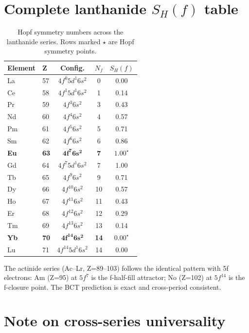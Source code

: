 \documentclass[aps,prl,onecolumn,superscriptaddress]{revtex4-2}
\begin{document}
\section{Complete lanthanide $S_H(f)$ table}

\begin{table}[h]
\centering
\caption{Hopf symmetry numbers across the lanthanide series.
Rows marked $\star$ are Hopf symmetry points.}
\begin{tabular}{llccc}
\toprule
Element & Z & Config. & $N_f$ & $S_H(f)$ \\
\midrule
La & 57 & $4f^0 5d^1 6s^2$ & 0 & 0.00 \\
Ce & 58 & $4f^1 5d^1 6s^2$ & 1 & 0.14 \\
Pr & 59 & $4f^3 6s^2$       & 3 & 0.43 \\
Nd & 60 & $4f^4 6s^2$       & 4 & 0.57 \\
Pm & 61 & $4f^5 6s^2$       & 5 & 0.71 \\
Sm & 62 & $4f^6 6s^2$       & 6 & 0.86 \\
\textbf{Eu} & \textbf{63} & $\mathbf{4f^7 6s^2}$
  & \textbf{7} & $\mathbf{1.00}^\star$ \\
Gd & 64 & $4f^7 5d^1 6s^2$ & 7 & 1.00 \\
Tb & 65 & $4f^9 6s^2$       & 9 & 0.71 \\
Dy & 66 & $4f^{10}6s^2$    & 10 & 0.57 \\
Ho & 67 & $4f^{11}6s^2$    & 11 & 0.43 \\
Er & 68 & $4f^{12}6s^2$    & 12 & 0.29 \\
Tm & 69 & $4f^{13}6s^2$    & 13 & 0.14 \\
\textbf{Yb} & \textbf{70} & $\mathbf{4f^{14}6s^2}$
  & \textbf{14} & $\mathbf{0.00}^\star$ \\
Lu & 71 & $4f^{14}5d^1 6s^2$ & 14 & 0.00 \\
\bottomrule
\end{tabular}
\end{table}

The actinide series (Ac--Lr, Z=89--103) follows the identical pattern
with 5f electrons: Am (Z=95) at $5f^7$ is the f-half-fill attractor;
No (Z=102) at $5f^{14}$ is the f-closure point.
The BCT prediction is exact and cross-period consistent.

\section*{Note on cross-series universality}
\end{document}
